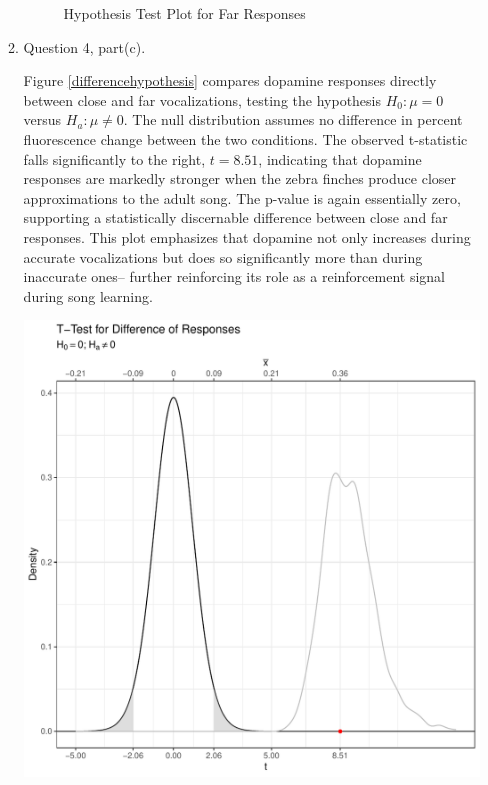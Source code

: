 \documentclass{article}\usepackage[]{graphicx}\usepackage[]{xcolor}
\makeatletter
\def\maxwidth{ %
  \ifdim\Gin@nat@width>\linewidth
    \linewidth
  \else
    \Gin@nat@width
  \fi
}
\newenvironment{knitrout}{}{} %
\makeatother
\begin{document}
\begin{enumerate}
\begin{enumerate}
  \begin{figure}[H]
\begin{center}

\caption{Hypothesis Test Plot for Far Responses}
\label{furtherhypothesis} %
\end{center}
\end{figure}
  
  
  \item Question 4, part(c).
  
  Figure \ref{differencehypothesis} compares dopamine responses directly between
  close and far vocalizations, testing the hypothesis $H_0: \mu = 0$ versus
  $H_a: \mu \neq 0$. The null distribution assumes no difference in percent
  fluorescence change between the two conditions. The observed t-statistic falls
  significantly to the right, $t=8.51$, indicating that dopamine responses are 
  markedly stronger when the zebra finches produce closer approximations to the
  adult song. The p-value is again essentially zero, supporting a statistically
  discernable difference between close and far responses. This plot emphasizes
  that dopamine not only increases during accurate vocalizations but does so
  significantly more than during inaccurate ones-- further reinforcing its role
  as a reinforcement signal during song learning.
  
\begin{knitrout}\scriptsize
{}\color{fgcolor}
\includegraphics[width=\maxwidth]{figure/plot4-1} 
\end{knitrout}


\end{enumerate}
\end{enumerate}
\end{document}
